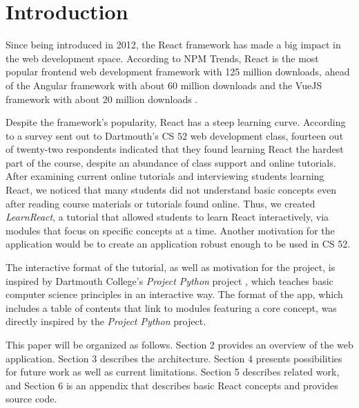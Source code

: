 \documentclass[11pt]{article}
\begin{document}
\maketitle


\section{Introduction}

Since being introduced in 2012, the React framework has made a big impact in the web development space. According to NPM Trends, React is the most popular frontend web development framework with 125 million downloads, ahead of the Angular framework with about 60 million downloads and the VueJS framework with about 20 million downloads \cite{popularity}.

Despite the framework's popularity, React has a steep learning curve. According to a survey sent out to Dartmouth's CS 52 web development class, fourteen out of twenty-two respondents indicated that they found learning React the hardest part of the course, despite an abundance of class support and online tutorials. After examining current online tutorials and interviewing students learning React, we noticed that many students did not understand basic concepts even after reading course materials or tutorials found online. Thus, we created \textit{LearnReact}, a tutorial that allowed students to learn React interactively, via modules that focus on specific concepts at a time. Another motivation for the application would be to create an application robust enough to be used in CS 52.

The interactive format of the tutorial, as well as motivation for the project, is inspired by Dartmouth College's \textit{Project Python} project \cite{pp}, which teaches basic computer science principles in an interactive way. The format of the app, which includes a table of contents that link to modules featuring a core concept, was directly inspired by the \textit{Project Python} project.

This paper will be organized as follows. Section 2 provides an overview of the web application. Section 3 describes the architecture. Section 4 presents possibilities for future work as well as current limitations. Section 5 describes related work, and Section 6 is an appendix that describes basic React concepts and provides source code.
\end{document}
